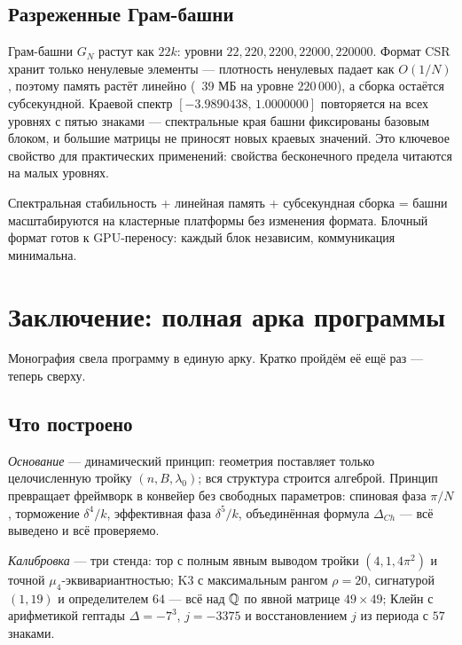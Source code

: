 \subsection{Разреженные Грам-башни}

Грам-башни $G_N$ растут как $22k$: уровни $22,220,2200,22000,
220000$. Формат CSR хранит только ненулевые элементы --- плотность
ненулевых падает как $O(1/N)$, поэтому память растёт линейно
(~39 МБ на уровне $220\,000$), а сборка остаётся субсекундной.
Краевой спектр $[-3.9890438,\,1.0000000]$ повторяется на всех
уровнях с пятью знаками --- спектральные края башни фиксированы
базовым блоком, и большие матрицы не приносят новых краевых
значений. Это ключевое свойство для практических применений:
свойства бесконечного предела читаются на малых уровнях.

\begin{databox}
Спектральная стабильность + линейная память + субсекундная сборка
= башни масштабируются на кластерные платформы без изменения
формата. Блочный формат готов к GPU-переносу: каждый блок
независим, коммуникация минимальна.
\end{databox}

\section{Заключение: полная арка программы}\label{sec:final}

Монография свела программу в единую арку. Кратко пройдём её
ещё раз --- теперь сверху.

\subsection{Что построено}

\emph{Основание} --- динамический принцип: геометрия поставляет
только целочисленную тройку $(n,B,\lambda_0)$; вся структура
строится алгеброй. Принцип превращает фреймворк в конвейер без
свободных параметров: спиновая фаза $\pi/N$, торможение
$\delta^4/k$, эффективная фаза $\delta^5/k$, объединённая формула
$\Delta_{Ch}$ --- всё выведено и всё проверяемо.

\emph{Калибровка} --- три стенда: тор с полным явным выводом
тройки $(4,1,4\pi^2)$ и точной $\mu_4$-эквивариантностью;
K3 с максимальным рангом $\rho=20$, сигнатурой $(1,19)$ и
определителем $64$ --- всё над $\mathbb{Q}$ по явной матрице $49\times49$;
Клейн с арифметикой гептады $\Delta=-7^3$, $j=-3375$ и
восстановлением $j$ из периода с $57$ знаками.

